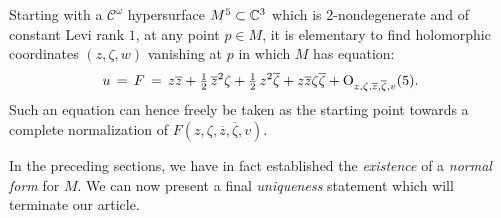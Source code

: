 \documentclass[12pt,twoside,leqno,openany]{amsart}
\begin{document}
\label{uniqueness-normal-form}

Starting with a $\mathcal{C}^\omega$ hypersurface
$M^5 \subset \mathbb{C}^3$ which is
$2$-nondegenerate and of constant Levi rank $1$, 
at any point $p \in M$, it is elementary to find
holomorphic coordinates $(z, \zeta,
w)$ vanishing at $p$ in which $M$ has
equation: 
\leqnomode{}
\begin{align}
\label{u-5}
u
\,=\,
F
\,=\,
z\overline{z}
+
\tfrac{1}{2}\,\overline{z}^2\zeta
+
\tfrac{1}{2}\,z^2\overline{\zeta}
+
z\overline{z}\zeta\overline{\zeta}
+
{\rm O}_{z,\zeta,\overline{z},\overline{\zeta},v}(5).
\end{align}
Such an equation can hence freely 
be taken as the starting point towards a complete
normalization of $F(z, \zeta, \overline{z}, \overline{\zeta}, v)$.

In the preceding sections, we have in fact established the {\em
existence} of a {\sl normal form} for $M$. We can now present 
a final {\sl uniqueness} statement which will terminate our article.
\end{document}
